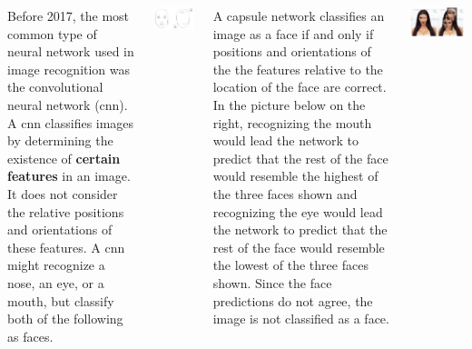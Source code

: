 \documentclass[25pt, a0paper, landscape]{tikzposter}
\begin{document}
\begin{columns}
{            %

            Before 2017, the most common type of neural network used in image recognition
            was the convolutional neural network (cnn). A cnn 
            classifies images by determining the existence of 
            \textbf{certain features} in an image. 
            It does not consider the relative positions and orientations of these features.
            A cnn might recognize a nose, an eye, or a mouth, but classify both
            of the following as faces.
            \begin{center}
                \cite{pechyonkin_2017}\includegraphics[scale=0.5]{cnn_problem.png}
            \end{center}
            A capsule network 
            \cite{NIPS2017_6975} 
            classifies an image as a face if and only if 
            positions and orientations of the the features relative to the 
            location of the face are correct.
            In the picture below on the right, recognizing the mouth would lead the network 
            to predict that the rest of the face would resemble the highest of 
            the three faces shown and recognizing the eye would lead the network 
            to predict that the rest of the face would resemble the lowest of 
            the three faces shown. Since the face predictions do not agree,
            the image is not classified as a face. 
            \begin{center}
                \cite{bourdakos_2018}\includegraphics[scale=0.3]{capsule_network_solution.png}

\end{center}}
\end{columns}
\end{document}
